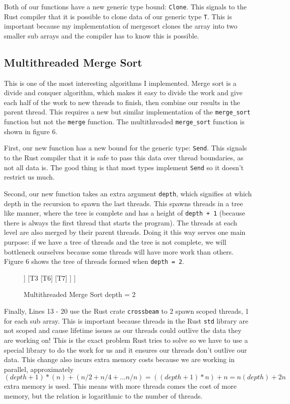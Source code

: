 \documentclass[12pt,letterpaper]{report}
\newcommand{\rust}[1]{\texttt{#1}}
\begin{document}
	Both of our functions have a new generic type bound: \rust{Clone}. This signals to the Rust compiler that it is possible to clone data of our generic type \rust{T}. This is important because my implementation of mergesort clones the array into two smaller sub arrays and the compiler has to know this is possible.

	\subsection*{Multithreaded Merge Sort}
	
	This is one of the most interesting algorithms I implemented. Merge sort is a divide and conquer algorithm, which makes it easy to divide the work and give each half of the work to new threads to finish, then combine our results in the parent thread. This requires a new but similar implementation of the \rust{merge_sort} function but not the \rust{merge} function. The multithreaded \rust{merge_sort} function is shown in figure 6.
	
	First, our new function has a new bound for the generic type: \rust{Send}. This signals to the Rust compiler that it is safe to pass this data over thread boundaries, as not all data is. The good thing is that most types implement \rust{Send} so it doesn't restrict us much.
	
	Second, our new function takes an extra argument \rust{depth}, which signifies at which depth in the recursion to spawn the last threads. This spawns threads in a tree like manner, where the tree is complete and has a height of \rust{depth + 1} (because there is always the first thread that starts the program). The threads at each level are also merged by their parent threads. Doing it this way serves one main purpose: if we have a tree of threads and the tree is not complete, we will bottleneck ourselves because some threads will have more work than others. Figure 6 shows the tree of threads formed when \rust{depth = 2}.

	\begin{figure}[H]	
	\begin{center}
	\begin{forest}
	[T1
		[T2
			[T4]
			[T5]
		]
		[T3
			[T6]
			[T7]
		]
	]
	\end{forest}
    \caption{Multithreaded Merge Sort depth = 2}
    \end{center}
\end{figure}

	
	Finally, Lines 13 - 20 use the Rust crate \rust{crossbeam} to 2 spawn scoped threads, 1 for each sub array. This is important because threads in the Rust \rust{std} library are not scoped and cause lifetime issues as our threads could outlive the data they are working on! This is the exact problem Rust tries to solve so we have to use a special library to do the work for us and it ensures our threads don't outlive our data. This change also incurs extra memory costs because we are working in parallel, approximately $(depth + 1) * (n) + (n/2 + n/4 + ... n/n) = ((depth + 1) * n) + n = n(depth) + 2n$ extra memory is used. This means with more threads comes the cost of more memory, but the relation is logarithmic to the number of threads.
	
\end{document}
